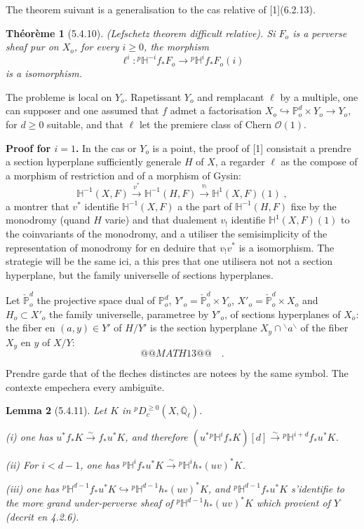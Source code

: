 \documentclass[12pt,a4paper]{article}
\theoremstyle{plain}
\newtheorem{theorem}{Th\'eor\`eme}[section]
\newtheorem{lemma}[theorem]{Lemma}
\theoremstyle{definition}
\theoremstyle{remark}
\newcommand{\HH}{\mathbb{H}}
\newcommand{\PP}{\mathbb{P}}
\newcommand{\QQ}{\mathbb{Q}}
\newcommand{\cO}{\mathcal{O}}
\begin{document}
The theorem suivant is a generalisation to the cas relative of [1](6.2.13).

\begin{theorem}[5.4.10]\label{thm:5.4.10}(Lefschetz theorem difficult relative).
Si $F_o$ is a perverse sheaf pur on $X_o$, for every $i \geq 0$, the morphism
\[
\ell^i: {}^{p}\HH^{-i}f_*F_o \to {}^{p}\HH^if_*F_o(i)
\]
is a isomorphism.
\end{theorem}

The probleme is local on $Y_o$. Rapetissant $Y_o$ and remplacant $\ell$ by a multiple, one can supposer and one assumed that $f$ admet a factorisation $X_o \hookrightarrow \PP^d_o \times Y_o \to Y_o$, for $d \geq 0$ suitable, and that $\ell$ let the premiere class of Chern $\cO(1)$.

\medskip
\noindent\textbf{Proof for $i = 1$.} In the cas or $Y_o$ is a point, the proof of [1] consistait a prendre a section hyperplane sufficiently generale $H$ of $X$, a regarder $\ell$ as the compose of a morphism of restriction and of a morphism of Gysin:
\[
\HH^{-1}(X, F) \xrightarrow{v^*} \HH^{-1}(H, F) \xrightarrow{v_!} \HH^1(X, F)(1)\;,
\]
a montrer that $v^*$ identifie $\HH^{-1}(X, F)$ a the part of $\HH^{-1}(H, F)$ fixe by the monodromy (quand $H$ varie) and that dualement $v_!$ identifie $\HH^1(X, F)(1)$ to the coinvariants of the monodromy, and a utiliser the semisimplicity of the representation of monodromy for en deduire that $v_!v^*$ is a isomorphism. The strategie will be the same ici, a this pres that one utilisera not not a section hyperplane, but the family universelle of sections hyperplanes.

Let $\check{\PP}^d_o$ the projective space dual of $\PP^d_o$, $Y'_o = \check{\PP}^d_o \times Y_o$, $X'_o = \check{\PP}^d_o \times X_o$ and $H_o \subset X'_o$ the family universelle, parametree by $Y'_o$, of sections hyperplanes of $X_o$: the fiber en $(a, y) \in Y'$ of $H/Y'$ is the section hyperplane $X_y \cap {}^\backslash a{}^\backslash$ of the fiber $X_y$ en $y$ of $X/Y$:
\[
@@MATH13@@\quad.
\]

Prendre garde that of the fleches distinctes are notees by the same symbol. The contexte empechera every ambigu\"ite.

\begin{lemma}[5.4.11]
Let $K$ in ${}^{p}D^{\geq 0}_c(X, \overline{\QQ}_{\ell})$.

\emph{(i)} one has $u^*f_*K \xrightarrow{\sim} f_*u^*K$, and therefore $(u^*{}^{p}\HH^if_*K)[d] \xrightarrow{\sim} {}^{p}\HH^{i+d}f_*u^*K$.

\emph{(ii)} For $i < d-1$, one has ${}^{p}\HH^if_*u^*K \xrightarrow{\sim} {}^{p}\HH^ih_*(uv)^*K$.

\emph{(iii)} one has ${}^{p}\HH^{d-1}f_*u^*K \hookrightarrow {}^{p}\HH^{d-1}h_*(uv)^*K$, and ${}^{p}\HH^{d-1}f_*u^*K$ s'identifie to the more grand under-perverse sheaf of ${}^{p}\HH^{d-1}h_*(uv)^*K$ which provient of $Y$ (decrit en 4.2.6).
\end{lemma}
\end{document}
